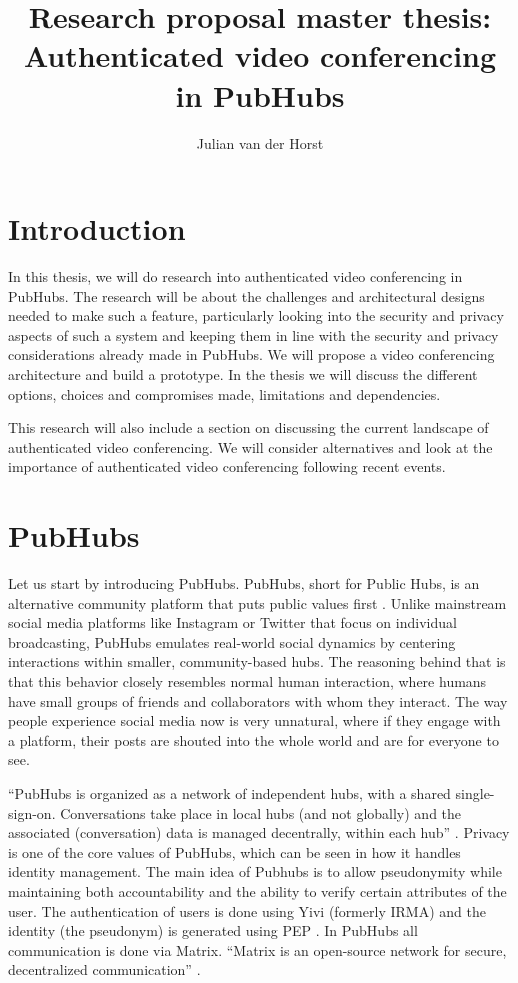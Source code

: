 \documentclass[11pt,a4paper]{article}
\title{Research proposal master thesis: \\ Authenticated video conferencing in PubHubs}
\author{Julian van der Horst}
\begin{document}
 
\maketitle
\section{Introduction}
In this thesis, we will do research into authenticated video conferencing in PubHubs. The research will be about the challenges and architectural designs needed to make such a feature, particularly looking into the security and privacy aspects of such a system and keeping them in line with the security and privacy considerations already made in PubHubs. We will propose a video conferencing architecture and build a prototype. In the thesis we will discuss the different options, choices and compromises made, limitations and dependencies. 

This research will also include a section on discussing the current landscape of authenticated video conferencing. We will consider alternatives and look at the importance of authenticated video conferencing following recent events.

\section{PubHubs}
Let us start by introducing PubHubs. PubHubs, short for Public Hubs, is an alternative community platform that puts public values first \cite{PH}. Unlike mainstream social media platforms like Instagram or Twitter that focus on individual broadcasting, PubHubs emulates real-world social dynamics by centering interactions within smaller, community-based hubs. The reasoning behind that is that this behavior closely resembles normal human interaction, where humans have small groups of friends and collaborators with whom they interact. The way people experience social media now is very unnatural, where if they engage with a platform, their posts are shouted into the whole world and are for everyone to see.

“PubHubs is organized as a network of independent hubs, with a shared single-sign-on. Conversations take place in local hubs (and not globally) and the associated (conversation) data is managed decentrally, within each hub” \cite{PH}. Privacy is one of the core values of PubHubs, which can be seen in how it handles identity management. The main idea of Pubhubs is to allow pseudonymity while maintaining both accountability and the ability to verify certain attributes of the user. The authentication of users is done using Yivi (formerly IRMA)\cite{YIVI} and the identity (the pseudonym) is generated using PEP \cite{PEP}. In PubHubs all communication is done via Matrix. “Matrix is an open-source network for secure, decentralized communication” \cite{MATRIX}.
\end{document}
